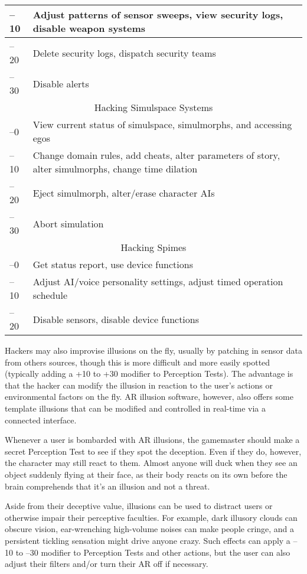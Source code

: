 \begin{table}
\begin{tabularx}{\textwidth}{|l|X|}
\hline
–10 & Adjust patterns of sensor sweeps, view security logs, disable weapon systems \\
\hline
–20 & Delete security logs, dispatch security teams \\
\hline
–30 & Disable alerts \\
\hline
\multicolumn{2}{|c|}{Hacking Simulspace Systems} \\
\hline
–0 & View current status of simulspace, simulmorphs, and accessing egos \\
\hline
–10 & Change domain rules, add cheats, alter parameters of story, alter simulmorphs, change time dilation \\
\hline
–20 & Eject simulmorph, alter/erase character AIs \\
\hline
–30 & Abort simulation \\
\hline
\multicolumn{2}{|c|}{Hacking Spimes} \\
\hline
–0 & Get status report, use device functions \\
\hline
–10 & Adjust AI/voice personality settings, adjust timed operation schedule \\
\hline
–20 & Disable sensors, disable device functions \\
\hline
\end{tabularx}
\end{table}

Hackers may also improvise illusions on the 
fly, usually by patching in sensor data from others 
sources, though this is more difficult and more easily 
spotted (typically adding a +10 to +30 modifier to 
Perception Tests). The advantage is that the hacker 
can modify the illusion in reaction to the user's actions
or environmental factors on the fly. AR illusion
software, however, also offers some template illusions 
that can be modified and controlled in real-time via a 
connected interface.

Whenever a user is bombarded with AR illusions, the 
gamemaster should make a secret Perception Test to see 
if they spot the deception. Even if they do, however, the 
character may still react to them. Almost anyone will 
duck when they see an object suddenly flying at their 
face, as their body reacts on its own before the brain 
comprehends that it's an illusion and not a threat.

Aside from their deceptive value, illusions can be 
used to distract users or otherwise impair their perceptive
faculties. For example, dark illusory clouds can
obscure vision, ear-wrenching high-volume noises can 
make people cringe, and a persistent tickling sensation 
might drive anyone crazy. Such effects can apply a –10 
to –30 modifier to Perception Tests and other actions, 
but the user can also adjust their filters and/or turn 
their AR off if necessary.

